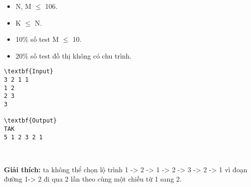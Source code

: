 \begin{itemize}
	\item N, M  $\le$  106.
	\item K  $\le$  N.
	\item 10\% số test M  $\le$  10.
	\item 20\% số test đồ thị không có chu trình.
\end{itemize}
\begin{verbatim}
\textbf{Input}
3 2 1 1
1 2
2 3
3

\textbf{Output}
TAK
5 1 2 3 2 1\end{verbatim}

 

\textbf{Giải thích:} ta không thể chọn lộ trình 1 -> 2 -> 1 -> 2 -> 3 -> 2 -> 1 vì đoạn đường 1-> 2 đi qua 2 lần theo cùng một chiều từ 1 sang 2.